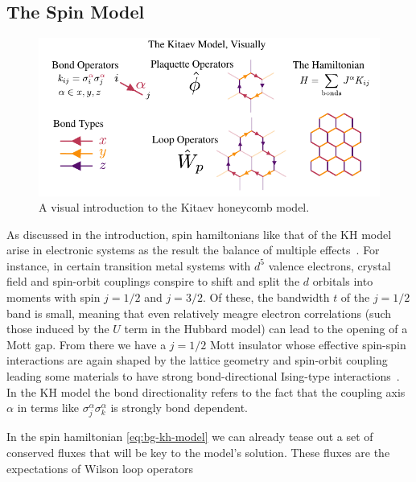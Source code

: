 \hypertarget{the-spin-model}{%
\subsection{The Spin Model}\label{the-spin-model}}

\hypertarget{fig:visual_kitaev_1}{%
\begin{figure}
\centering
\includegraphics[width=1\textwidth,height=\textheight]{figure_code/amk_chapter/visual_kitaev_1}
\caption[{A Visual Intro to the Kitaev Model}]{A visual introduction to the Kitaev honeycomb model.}
\label{fig:visual_kitaev_1}
\end{figure}
}

As discussed in the introduction, spin hamiltonians like that of the KH model arise in electronic systems as the result the balance of multiple effects~\autocite{TrebstPhysRep2022}. For instance, in certain transition metal systems with \(d^5\) valence electrons, crystal field and spin-orbit couplings conspire to shift and split the \(d\) orbitals into moments with spin \(j = 1/2\) and \(j = 3/2\). Of these, the bandwidth \(t\) of the \(j= 1/2\) band is small, meaning that even relatively meagre electron correlations (such those induced by the \(U\) term in the Hubbard model) can lead to the opening of a Mott gap. From there we have a \(j = 1/2\) Mott insulator whose effective spin-spin interactions are again shaped by the lattice geometry and spin-orbit coupling leading some materials to have strong bond-directional Ising-type interactions~\autocite{jackeliMottInsulatorsStrong2009,khaliullinOrbitalOrderFluctuations2005}. In the KH model the bond directionality refers to the fact that the coupling axis \(\alpha\) in terms like \(\sigma_j^{\alpha}\sigma_k^{\alpha}\) is strongly bond dependent.

In the spin hamiltonian \cref{eq:bg-kh-model} we can already tease out a set of conserved fluxes that will be key to the model's solution. These fluxes are the expectations of Wilson loop operators


